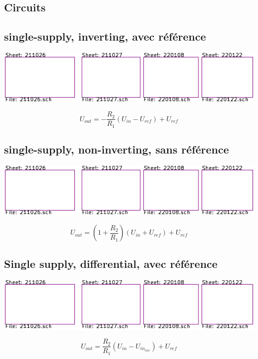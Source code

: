 \documentclass[resume]{subfiles}
\begin{document}
\begin{multicols}{3}
\section{Circuits}
\subsection{single-supply, inverting, avec référence}
\begin{center}
\includegraphics[scale=1,page=15]{../KiCad/resume-crop.pdf}
\end{center}
$$\boxed{U_{out}=-\frac{R_2}{R_1}\left(U_{in}-U_{ref}\right)+U_{ref}}$$
\subsection{single-supply, non-inverting, sans référence}
\begin{center}
\includegraphics[scale=1,page=16]{../KiCad/resume-crop.pdf}
\end{center}
$$\boxed{U_{out}=\left(1+\frac{R_2}{R_1}\right)\left(U_{in}+U_{ref}\right)+U_{ref}}$$
\subsection{Single supply, differential, avec référence}
\begin{center}
\includegraphics[scale=1,page=5]{../KiCad/resume-crop.pdf}
\end{center}
$$\boxed{U_{out}=\frac{R_2}{R_1}\left(U_{in}-U_{in_{inv}}\right)+U_{ref}}$$

\end{multicols}
\end{document}
